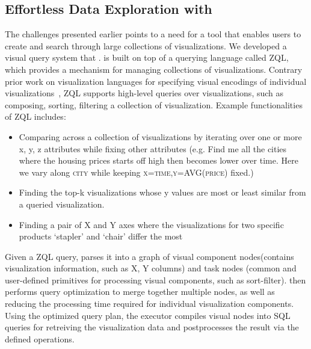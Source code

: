 \subsection{Effortless Data Exploration with \zv}
\par The challenges presented earlier points to a need for a tool that enables users to create and search through large collections of visualizations. We developed \zv a visual query system that . \zv is built on top of a querying language called ZQL, which provides a mechanism for managing collections of visualizations\cite{Siddiqui}. Contrary prior work on visualization languages for specifying visual encodings of individual visualizations~\cite{Stolte2002,Wilkinson2005}, ZQL supports high-level queries over visualizations, such as composing, sorting, filtering a collection of visualization. Example functionalities of ZQL includes: 
\begin{itemize}
	\item Comparing across a collection of visualizations by iterating over one or more x, y, z attributes while fixing other attributes (e.g. Find me all the cities where the housing prices starts off high then becomes lower over time. Here we vary along \textsc{city} while keeping \textsc{x=time,y=AVG(price)} fixed.)
	\item Finding the top-k visualizations whose y values are most or least similar from a queried visualization. 
	\item Finding a pair of X and Y axes where the visualizations for two specific products ‘stapler’ and ‘chair’ differ the most
\end{itemize}
\par Given a ZQL query, \zv parses it into a graph of visual component nodes(contains visualization information, such as X, Y columns) and task nodes (common and user-defined primitives for processing visual components, such as sort-filter). \zv then performs query optimization to merge together multiple nodes, as well as reducing the processing time required for individual visualization components. Using the optimized query plan, the executor compiles visual nodes into SQL queries for retreiving the visualization data and postprocesses the result via the defined operations. 
